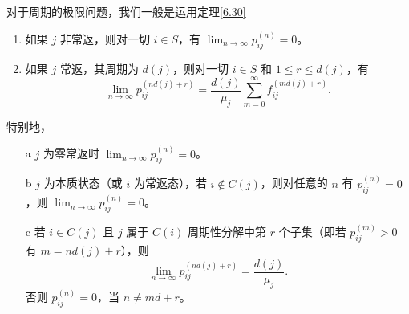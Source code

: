 \documentclass[lang=cn,10pt,thmcnt=section]{elegantbook}
\begin{document}
\begin{remark}
	对于周期的极限问题，我们一般是运用定理\ref{6.30}

	\begin{theorem}



		\begin{enumerate}
			\item 如果 \(j\) 非常返，则对一切 \(i \in S\)，有 \(\lim_{n \to \infty} p_{ij}^{(n)} = 0\)。
			\item 如果 \(j\) 常返，其周期为 \(d(j)\)，则对一切 \(i \in S\) 和 \(1 \leq r \leq d(j)\)，有
			\[
			\lim_{n \to \infty} p_{ij}^{(nd(j)+r)} = \frac{d(j)}{\mu_j} \sum_{m=0}^{\infty} f_{ij}^{(md(j)+r)}.
			\]
		\end{enumerate}
		
		特别地，
		
		\begin{enumerate}
			\item[a] \(j\) 为零常返时 \(\lim_{n \to \infty} p_{ij}^{(n)} = 0\)。
			\item[b]	 \(j\) 为本质状态（或 \(i\) 为常返态），若 \(i \notin C(j)\)，则对任意的 \(n\) 有 \(p_{ij}^{(n)} = 0\)，则 \(\lim_{n \to \infty} p_{ij}^{(n)} = 0\)。
			\item[c] 若 \(i \in C(j)\) 且 \(j\) 属于 \(C(i)\) 周期性分解中第 \(r\) 个子集（即若 \(p_{ij}^{(m)} > 0\) 有 \(m = nd(j) + r\)），则
		\[
		\lim_{n \to \infty} p_{ij}^{(nd(j)+r)} = \frac{d(j)}{\mu_j}.
		\]
		否则 \(p_{ij}^{(n)} = 0\)，当 \(n \neq md + r\)。
		\end{enumerate}
\end{theorem}
\end{remark}
\end{document}
